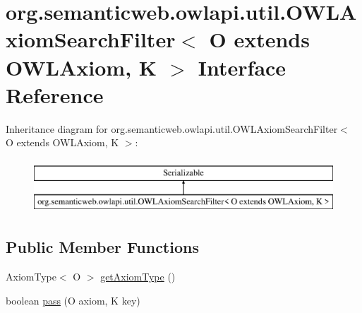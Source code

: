 \hypertarget{interfaceorg_1_1semanticweb_1_1owlapi_1_1util_1_1_o_w_l_axiom_search_filter_3_01_o_01extends_01_o_w_l_axiom_00_01_k_01_4}{\section{org.\-semanticweb.\-owlapi.\-util.\-O\-W\-L\-Axiom\-Search\-Filter$<$ O extends O\-W\-L\-Axiom, K $>$ Interface Reference}
\label{interfaceorg_1_1semanticweb_1_1owlapi_1_1util_1_1_o_w_l_axiom_search_filter_3_01_o_01extends_01_o_w_l_axiom_00_01_k_01_4}
}
Inheritance diagram for org.\-semanticweb.\-owlapi.\-util.\-O\-W\-L\-Axiom\-Search\-Filter$<$ O extends O\-W\-L\-Axiom, K $>$\-:\begin{figure}[H]
\begin{center}
\leavevmode
\includegraphics[height=2.000000cm]{interfaceorg_1_1semanticweb_1_1owlapi_1_1util_1_1_o_w_l_axiom_search_filter_3_01_o_01extends_01_o_w_l_axiom_00_01_k_01_4}
\end{center}
\end{figure}
\subsection*{Public Member Functions}
\begin{DoxyCompactItemize}
\item 
Axiom\-Type$<$ O $>$ \hyperlink{interfaceorg_1_1semanticweb_1_1owlapi_1_1util_1_1_o_w_l_axiom_search_filter_3_01_o_01extends_01_o_w_l_axiom_00_01_k_01_4_ae71ab4bfbdce4b5f06b5ad57a5f4bb14}{get\-Axiom\-Type} ()
\item 
boolean \hyperlink{interfaceorg_1_1semanticweb_1_1owlapi_1_1util_1_1_o_w_l_axiom_search_filter_3_01_o_01extends_01_o_w_l_axiom_00_01_k_01_4_aed5f5fe53e88ab1ac55f7e96c6980bec}{pass} (O axiom, K key)
\end{DoxyCompactItemize}



